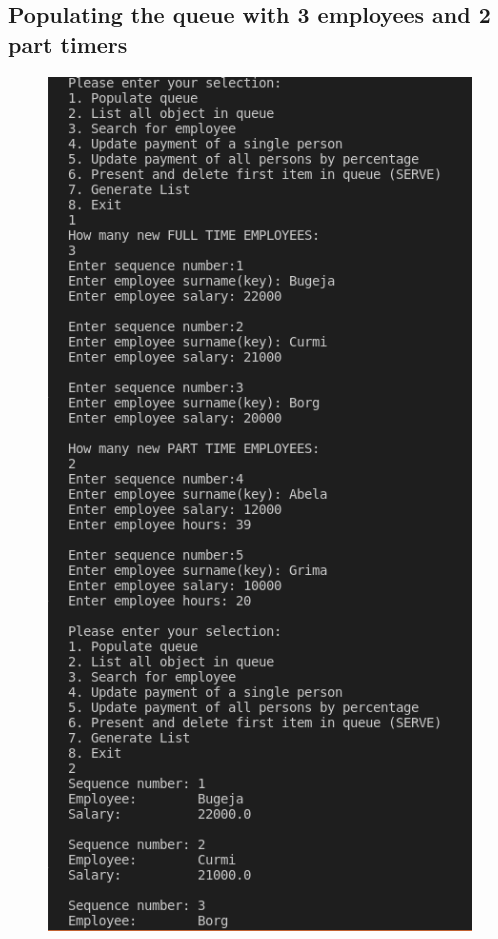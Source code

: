 \documentclass[12pt]{article}
\begin{document}
\newpage
\subsection{Populating the queue with 3 employees and 2 part timers}
\begin{figure}[h]
\centering
\includegraphics[scale=0.30]{Images/Testing 1/1.png}
\end{figure}
\end{document}
